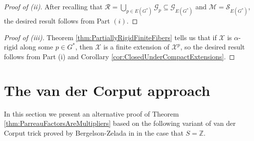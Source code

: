 \documentclass[graybox]{svmult}
\theoremstyle{definition}
\newcommand{\Z}{\mathbb{Z}}
\begin{document}
\begin{proof}[Proof of (ii)]
    After recalling that $\mathcal{R} = \bigcup_{p \in E(G^*)}\mathcal{G}_p \subseteq \mathcal{G}_{E(G^*)}$ and $\mathcal{M} = \mathcal{S}_{E(G^*)}$, the desired result follows from Part $(i)$.
\end{proof}

\begin{proof}[Proof of (iii)]
    Theorem \ref{thm:PartiallyRigidFiniteFibers} tells us that if $\mathcal{X}$ is $\alpha$-rigid along some $p \in G^*$, then $\mathcal{X}$ is a finite extension of $\mathcal{X}^p$, so the desired result follows from Part (i) and Corollary \ref{cor:ClosedUnderCompactExtensions}.    
\end{proof}
\section{The van der Corput approach}\label{sec:vdC}
In this section we present an alternative proof of  Theorem \ref{thm:ParreauFactorsAreMultipliers} based on the following variant of van der Corput trick proved by Bergelson-Zelada in \cite{StronglyMixingPET} in the case that $S=\Z$. 
\end{document}
